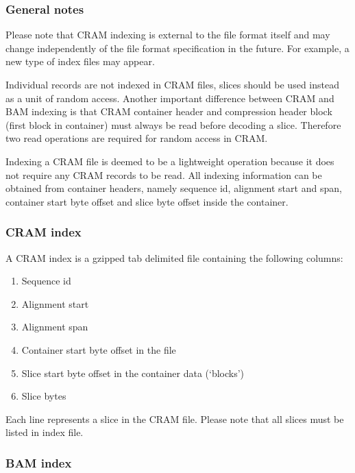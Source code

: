 \documentclass[a4paper]{article}
\begin{document}
\subsubsection*{General notes}

Please note that CRAM indexing is external to the file format itself and may change 
independently of the file format specification in the future. For example, a new 
type of index files may appear. 

Individual records are not indexed in CRAM files, slices should be used instead 
as a unit of random access. Another important difference between CRAM and BAM indexing 
is that CRAM container header and compression header block (first block in container) 
must always be read before decoding a slice. Therefore two read operations are 
required for random access in CRAM.

Indexing a CRAM file is deemed to be a lightweight operation because it does not 
require any CRAM records to be read. All indexing information can be obtained from 
container headers, namely sequence id, alignment start and span, container start 
byte offset and slice byte offset inside the container. 

\subsubsection*{CRAM index}

A CRAM index is a gzipped tab delimited file containing the following columns:

\begin{enumerate}
\item Sequence id

\item Alignment start

\item Alignment span

\item Container start byte offset in the file

\item Slice start byte offset in the container data (`blocks')

\item Slice bytes
\end{enumerate}

Each line represents a slice in the CRAM file. Please note that all slices must 
be listed in index file.

\subsubsection*{BAM index}
\end{document}
